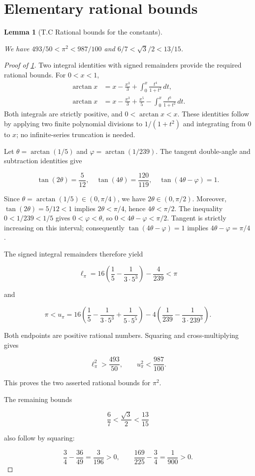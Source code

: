 \documentclass[11pt,a4paper]{article}
\theoremstyle{proofmanuscript}
\newtheorem{lemma}[theorem]{Lemma}
\begin{document}
\section{Elementary rational bounds}

\begin{lemma}[T.C Rational bounds for the constants]\label{lem-pi-rational}

We have \(493/50<\pi^2<987/100\) and \(6/7<\sqrt3/2<13/15\).

\end{lemma}

\begin{proof}[Proof of \ref{lem-pi-rational}]

Two integral identities with signed remainders provide the required rational bounds. For \(0<x<1\), \[
\begin{aligned}
\arctan x&=x-\frac{x^3}{3}+\int_0^x\frac{t^4}{1+t^2}\,dt,\\
\arctan x&=x-\frac{x^3}{3}+\frac{x^5}{5}
-\int_0^x\frac{t^6}{1+t^2}\,dt.
\end{aligned}
\] Both integrals are strictly positive, and \(0<\arctan x<x\). These identities follow by applying two finite polynomial divisions to \(1/(1+t^2)\) and integrating from \(0\) to \(x\); no infinite-series truncation is needed.

Let \(\theta=\arctan(1/5)\) and \(\varphi=\arctan(1/239)\). The tangent double-angle and subtraction identities give

\[
\tan(2\theta)=\frac5{12},\quad
\tan(4\theta)=\frac{120}{119},\quad
\tan(4\theta-\varphi)=1.
\]

Since \(\theta=\arctan(1/5)\in(0,\pi/4)\), we have \(2\theta\in(0,\pi/2)\). Moreover, \(\tan(2\theta)=5/12<1\) implies \(2\theta<\pi/4\), hence \(4\theta<\pi/2\). The inequality \(0<1/239<1/5\) gives \(0<\varphi<\theta\), so \(0<4\theta-\varphi<\pi/2\). Tangent is strictly increasing on this interval; consequently \(\tan(4\theta-\varphi)=1\) implies \(4\theta-\varphi=\pi/4\).

The signed integral remainders therefore yield

\[
\ell_\pi=
16\left(\frac15-\frac1{3\cdot5^3}\right)-\frac4{239}
<\pi
\]

and

\[
\pi<
u_\pi=
16\left(\frac15-\frac1{3\cdot5^3}+\frac1{5\cdot5^5}\right)
-4\left(\frac1{239}-\frac1{3\cdot239^3}\right).
\]

Both endpoints are positive rational numbers. Squaring and cross-multiplying gives

\[
\ell_\pi^2>\frac{493}{50},\qquad
u_\pi^2<\frac{987}{100}.
\]

This proves the two asserted rational bounds for \(\pi^2\).

The remaining bounds

\[
\frac67<\frac{\sqrt3}{2}<\frac{13}{15}
\]

also follow by squaring:

\[
\frac34-\frac{36}{49}=\frac3{196}>0,\qquad
\frac{169}{225}-\frac34=\frac1{900}>0.
\]

\end{proof}
\end{document}
